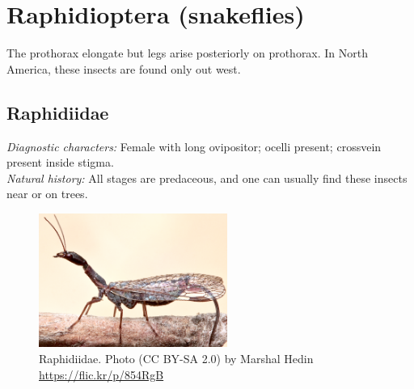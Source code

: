\documentclass[letterpaper, 11pt]{article}
\begin{document}
\section{Raphidioptera (snakeflies)}
The prothorax elongate but legs arise posteriorly on prothorax. In North America, these insects are found only out west.\\

\subsection{Raphidiidae}
\noindent{}\textit{Diagnostic characters:} Female with long ovipositor; ocelli present; crossvein present inside stigma.\\

\noindent{}\textit{Natural history:} All stages are predaceous, and one can usually find these insects near or on trees.\\

\begin{figure}[ht!]
  \centering
    \includegraphics[width=0.55\textwidth]{RaphidiidHabitus}
  \caption{Raphidiidae. Photo (CC BY-SA 2.0) by Marshal Hedin \url{https://flic.kr/p/854RgB}}
  \label{fig:raphid}
\end{figure}

\FloatBarrier


\end{document}
